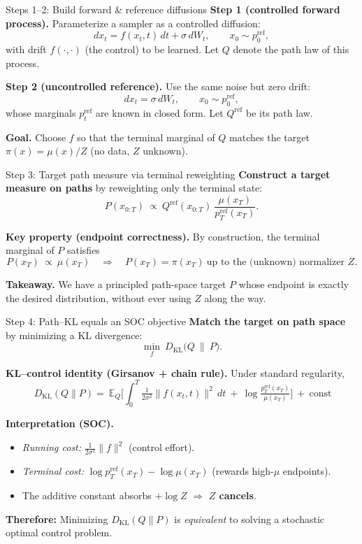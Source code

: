 \documentclass[aspectratio=169,xcolor=dvipsnames]{beamer}
\begin{document}
\begin{frame}[t]{Steps 1--2: Build forward \& reference diffusions}
\footnotesize
\textbf{Step 1 (controlled forward process).} Parameterize a sampler as a controlled diffusion:
\[
dx_t = f(x_t,t)\,dt + \sigma\,dW_t,\qquad x_0 \sim p^{\text{ref}}_0,
\]
with drift $f(\cdot,\cdot)$ (the control) to be learned. Let $Q$ denote the path law of this process.

\medskip
\textbf{Step 2 (uncontrolled reference).} Use the same noise but zero drift:
\[
dx_t = \sigma\,dW_t,\qquad x_0 \sim p^{\text{ref}}_0,
\]
whose marginals $p^{\text{ref}}_t$ are known in closed form. Let $Q^{\text{ref}}$ be its path law.

\medskip
\textbf{Goal.} Choose $f$ so that the terminal marginal of $Q$ matches the target $\pi(x)=\mu(x)/Z$ (no data, $Z$ unknown).
\end{frame}

\begin{frame}[t]{Step 3: Target path measure via terminal reweighting}
\footnotesize
\textbf{Construct a target measure on paths} by reweighting only the terminal state:
\[
P(x_{0:T}) \ \propto\ Q^{\text{ref}}(x_{0:T})\ \frac{\mu(x_T)}{p^{\text{ref}}_T(x_T)}.
\]

\textbf{Key property (endpoint correctness).}
By construction, the terminal marginal of $P$ satisfies
\[
P(x_T) \ \propto\ \mu(x_T)\quad \Longrightarrow \quad P(x_T) = \pi(x_T)\ \text{up to the (unknown) normalizer } Z.
\]

\textbf{Takeaway.} We have a principled path-space target $P$ whose endpoint is exactly the desired distribution, without ever using $Z$ along the way.
\end{frame}

\begin{frame}[t]{Step 4: Path--KL equals an SOC objective}
\footnotesize
\textbf{Match the target on path space} by minimizing a KL divergence:
\[
\min_{f}\ D_{\mathrm{KL}}\!\big(Q\ \|\ P\big).
\]

\textbf{KL--control identity (Girsanov + chain rule).}
Under standard regularity,
\[
\boxed{\
D_{\mathrm{KL}}(Q\|P)
=\ \mathbb E_{Q}\!\Big[\int_0^T \tfrac{1}{2\sigma^2}\|f(x_t,t)\|^2\,dt
\ +\ \log\tfrac{p^{\text{ref}}_T(x_T)}{\mu(x_T)}\Big]\ +\ \text{const}
}
\]

\textbf{Interpretation (SOC).}
\begin{itemize}\itemsep2pt
  \item \emph{Running cost:} $\tfrac{1}{2\sigma^2}\|f\|^2$ (control effort).
  \item \emph{Terminal cost:} $\log p^{\text{ref}}_T(x_T)-\log\mu(x_T)$ (rewards high-$\mu$ endpoints).
  \item The additive constant absorbs $+\log Z$ $\Rightarrow$ \textbf{$Z$ cancels}.
\end{itemize}

\textbf{Therefore:} Minimizing $D_{\mathrm{KL}}(Q\|P)$ is \emph{equivalent} to solving a stochastic optimal control problem.
\end{frame}
\end{document}
